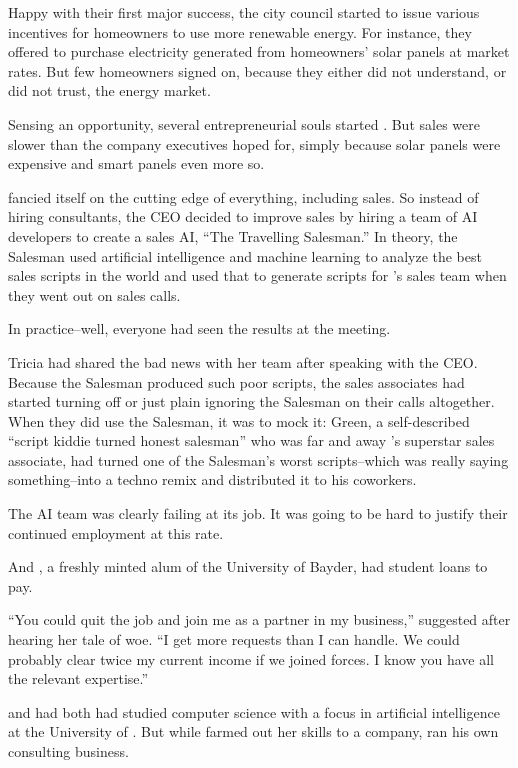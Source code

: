 Happy with their first major success, the city council started to issue various incentives for homeowners to use more renewable energy. For instance, they offered to purchase electricity generated from homeowners' solar panels at market rates. But few homeowners signed on, because they either did not understand, or did not trust, the energy market.
 
Sensing an opportunity, several entrepreneurial souls started \energyCompany{}. But sales were slower than the company executives hoped for, simply because solar panels were expensive and smart panels even more so.
 
\energyCompany{} fancied itself on the cutting edge of everything, including sales. So instead of hiring consultants, the CEO decided to improve sales by hiring a team of AI developers to create a sales AI, ``The Travelling Salesman.'' In theory, the Salesman used artificial intelligence and machine learning to analyze the best sales scripts in the world and used that to generate scripts for  \energyCompany{}'s sales team when they went out on sales calls.

In practice--well, everyone had seen the results at the meeting.

Tricia had shared the bad news with her team after speaking with the CEO. Because the Salesman produced such poor scripts, the sales associates had started turning off or just plain ignoring the Salesman on their calls altogether. When they did use the Salesman, it was to mock it: {\energyJerk} Green, a self-described ``script kiddie turned honest salesman'' who was far and away  \energyCompany{}'s superstar sales associate, had turned one of the Salesman's worst scripts--which was really saying something--into a techno remix and distributed it to his coworkers.

The AI team was clearly failing at its job. It was going to be hard to justify their continued employment at this rate.

And {\protag}, a freshly minted alum of the University of Bayder, had student loans to pay.

``You could quit the job and join me as a partner in my business,'' {\sidetag} suggested after hearing her tale of woe. ``I get more requests than I can handle. We could probably clear twice my current income if we joined forces. I know you have all the relevant expertise.''

{\protag} and {\sidetag} had both had studied computer science with a focus in artificial intelligence at the University of  {\crunchyCity}. But while {\protag} farmed out her skills to a company, {\sidetag} ran his own consulting business.

